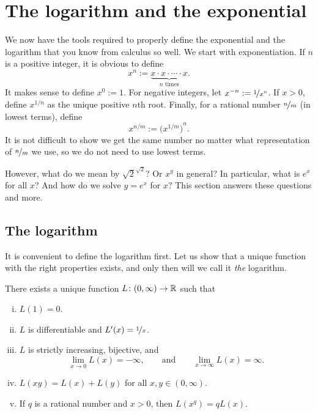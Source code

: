 
\sectionnewpage
\section{The logarithm and the exponential}
\label{sec:logandexp}


We now have the tools required to properly define the exponential
and the
logarithm that you know from calculus so well.  We start with
exponentiation.
If $n$ is a positive integer, it is obvious to define
\begin{equation*}
x^n := \underbrace{x \cdot x \cdot \cdots \cdot x}_{n \text{ times}} .
\end{equation*}
It makes sense to define $x^0 := 1$.
For negative integers, let $x^{-n} := \nicefrac{1}{x^n}$.
If $x > 0$, define
$x^{1/n}$ as
the unique positive $n$th root.  Finally, for a rational
number $\nicefrac{n}{m}$ (in lowest terms), define
\begin{equation*}
x^{n/m} := {\bigl(x^{1/m}\bigr)}^n .
\end{equation*}
It is not difficult to show 
we get the same number no matter what
representation of $\nicefrac{n}{m}$ we use, so we do not need to use
lowest terms.

However, what do we mean by $\sqrt{2}^{\sqrt{2}}$?  Or
$x^y$ in general?  In particular, what is $e^x$ for all $x$?
And how do we solve $y=e^x$ for $x$?
This section answers these questions and more.

\subsection{The logarithm}

It is convenient to define the logarithm first.
Let us show that
a unique function with the right properties exists, and only then will
we call it \emph{the} logarithm.

\begin{prop}
There exists a unique function $L \colon (0,\infty) \to {\mathbb{R}}$ such that
\begin{enumerate}[(i)]
\item \label{it:log:i}
$L(1) = 0$.
\item \label{it:log:ii}
$L$ is differentiable and $L'(x) = \nicefrac{1}{x}$.
\item \label{it:log:iii}
$L$ is strictly increasing, bijective, and
\begin{equation*}
\lim_{x\to 0} L(x) = -\infty , \qquad \text{and} \qquad
\lim_{x\to \infty} L(x) = \infty .
\end{equation*}
\item \label{it:log:iv}
$L(xy) = L(x)+L(y)$ for all $x,y \in (0,\infty)$.
\item \label{it:log:v}
If $q$ is a rational number and $x > 0$, then
$L(x^q) = q L(x)$.
\end{enumerate}
\end{prop}

